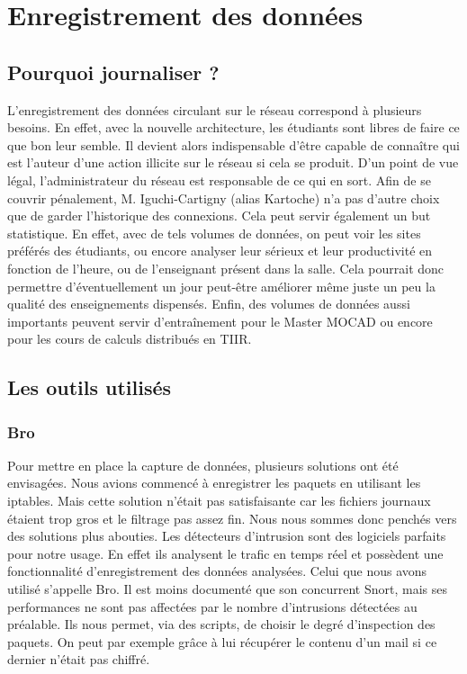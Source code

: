 \chapter{Enregistrement des données}
\label{chap:Enregistrement des données}

\section{Pourquoi journaliser ?}

L'enregistrement des données circulant sur le réseau correspond à plusieurs besoins. En effet, avec la nouvelle architecture, les étudiants sont libres de faire ce que bon leur semble. Il devient alors indispensable d'être capable de connaître qui est l'auteur d'une action illicite sur le réseau si cela se produit. D'un point de vue légal, l'administrateur du réseau est responsable de ce qui en sort. Afin de se couvrir pénalement, M. Iguchi-Cartigny (alias Kartoche) n'a pas d'autre choix que de garder l'historique des connexions.
Cela peut servir également un but statistique. En effet, avec de tels volumes de données, on peut voir les sites préférés des étudiants, ou encore analyser leur sérieux et leur productivité en fonction de l'heure, ou de l'enseignant présent dans la salle. Cela pourrait donc permettre d'éventuellement un jour peut-être améliorer même juste un peu la qualité des enseignements dispensés.
Enfin, des volumes de données aussi importants peuvent servir d'entraînement pour le Master MOCAD ou encore pour les cours de calculs distribués en TIIR.

\section{Les outils utilisés}

\subsection{Bro}

Pour mettre en place la capture de données, plusieurs solutions ont été envisagées. Nous avions commencé à enregistrer les paquets en utilisant les iptables. Mais cette solution n'était pas satisfaisante car les fichiers journaux étaient trop gros et le filtrage pas assez fin. Nous nous sommes donc penchés vers des solutions plus abouties. Les détecteurs d'intrusion sont des logiciels parfaits pour notre usage. En effet ils analysent le trafic en temps réel et possèdent une fonctionnalité d'enregistrement des données analysées. Celui que nous avons utilisé s'appelle Bro. Il est moins documenté que son concurrent Snort, mais ses performances ne sont pas affectées par le nombre d'intrusions détectées au préalable. Ils nous permet, via des scripts, de choisir le degré d'inspection des paquets. On peut par exemple grâce à lui récupérer le contenu d'un mail si ce dernier n'était pas chiffré.


